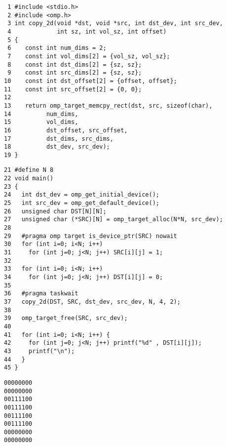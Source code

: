 \begin{figure*}[!tb]
\begin{verbatim}
 1 #include <stdio.h>
 2 #include <omp.h>
 3 int copy_2d(void *dst, void *src, int dst_dev, int src_dev,
 4             int sz, int vol_sz, int offset)
 5 {
 6    const int num_dims = 2;
 7    const int vol_dims[2] = {vol_sz, vol_sz};
 8    const int dst_dims[2] = {sz, sz};
 9    const int src_dims[2] = {sz, sz};
10    const int dst_offset[2] = {offset, offset};
11    const int src_offset[2] = {0, 0};
12 
13    return omp_target_memcpy_rect(dst, src, sizeof(char),
14          num_dims,
15          vol_dims,
16          dst_offset, src_offset,
17          dst_dims, src_dims,
18          dst_dev, src_dev);
19 }
\end{verbatim}
\caption{ \textbf {Copy a sub-matrix from a source matrix to a destination matrix - part 1} -- \small
          Two-dimensional square matrices are assumed.
          Copy a sub-matrix from \texttt{src[0][0]} to \texttt{dst[offset][offset]}.
         }
\label{figure:chapter6-copy-volume}
\end{figure*}


\begin{figure*}[!tb]
\begin{verbatim}
21 #define N 8
22 void main()
23 {
24   int dst_dev = omp_get_initial_device();
25   int src_dev = omp_get_default_device();
26   unsigned char DST[N][N];
27   unsigned char (*SRC)[N] = omp_target_alloc(N*N, src_dev);
28 
29   #pragma omp target is_device_ptr(SRC) nowait
30   for (int i=0; i<N; i++)
31     for (int j=0; j<N; j++) SRC[i][j] = 1;
32 
33   for (int i=0; i<N; i++)
34     for (int j=0; j<N; j++) DST[i][j] = 0;
35 
36   #pragma taskwait
37   copy_2d(DST, SRC, dst_dev, src_dev, N, 4, 2);
38 
39   omp_target_free(SRC, src_dev);
40 
41   for (int i=0; i<N; i++) {
42     for (int j=0; j<N; j++) printf("%d" , DST[i][j]);
43     printf("\n");
44   }
45 }
\end{verbatim}
\caption{ \textbf {Copy a sub-matrix from a source matrix to a destination matrix - part 2} -- \small
          Allocate and initialize an $8x8$ \texttt{SRC} matrix on an accelerator and fill it with $1$.
          Initialize an $8x8$ \texttt{DST} matrix on the host and fill it with $0$.
          Copy a $4x4$ sub-matrix from \texttt{SRC[0][0]} to \texttt{DST[2][2]}.
         }
\label{figure:chapter6-copy-volume-p2}
\end{figure*}


\begin{figure*}[!tb]
\begin{verbatim}
00000000
00000000
00111100
00111100
00111100
00111100
00000000
00000000
\end{verbatim}
\caption{ \textbf {Example output from the sub-matrix copy program } -- \small
          This is the output from the program in Figure~\ref{figure:chapter6-copy-volume}
          and Figure~\ref{figure:chapter6-copy-volume-p2}.
          A $4x4$ sub-matrix from the \texttt{SRC} matrix was copied into the center of the \texttt{DST} matrix.
         }
\label{figure:chapter6-copy-volume-output}
\end{figure*}
